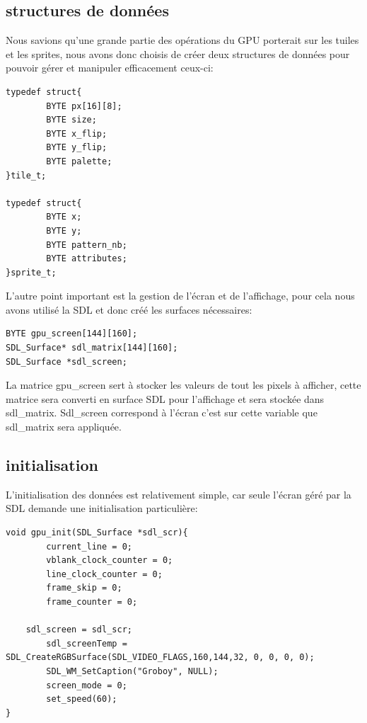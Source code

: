 \documentclass{report}
\begin{document}
\subsection{structures de données}
	Nous savions qu'une grande partie des opérations du GPU porterait sur les tuiles et les sprites, nous avons donc choisis de créer deux structures de données pour pouvoir gérer et manipuler efficacement ceux-ci:\\ 
\begin{lstlisting}
typedef struct{
        BYTE px[16][8];
        BYTE size;
        BYTE x_flip;
        BYTE y_flip;
        BYTE palette;
}tile_t;

typedef struct{
        BYTE x;
        BYTE y;
        BYTE pattern_nb;
        BYTE attributes;
}sprite_t;
\end{lstlisting}

L'autre point important est la gestion de l'écran et de l'affichage, pour cela nous avons utilisé la SDL et donc créé les surfaces nécessaires:\\
\begin{lstlisting}
BYTE gpu_screen[144][160];
SDL_Surface* sdl_matrix[144][160];
SDL_Surface *sdl_screen;
\end{lstlisting}

La matrice gpu_screen sert à stocker les valeurs de tout les pixels à afficher, cette matrice sera converti en surface SDL pour l'affichage et sera stockée dans sdl_matrix. Sdl_screen correspond à l'écran c'est sur cette variable que sdl_matrix sera appliquée.\\

\subsection{initialisation}
	L'initialisation des données est relativement simple, car seule l'écran géré par la SDL demande une initialisation particulière:\\
\begin{lstlisting}
void gpu_init(SDL_Surface *sdl_scr){
        current_line = 0;
        vblank_clock_counter = 0;
        line_clock_counter = 0;
        frame_skip = 0;
        frame_counter = 0;
        
	sdl_screen = sdl_scr;
        sdl_screenTemp = SDL_CreateRGBSurface(SDL_VIDEO_FLAGS,160,144,32, 0, 0, 0, 0);
        SDL_WM_SetCaption("Groboy", NULL);
        screen_mode = 0;
        set_speed(60);
}

\end{lstlisting}
\end{document}
